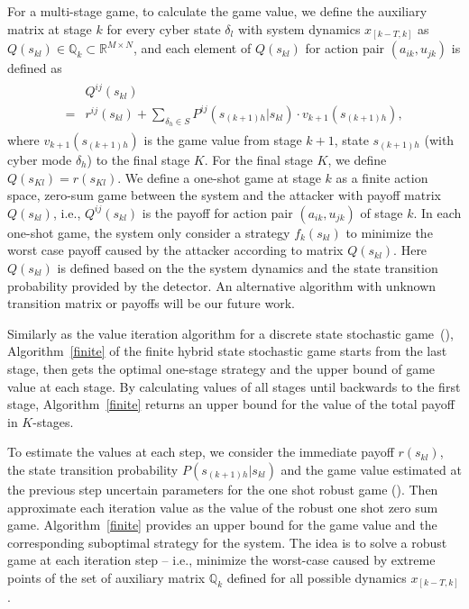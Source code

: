 For a multi-stage game, to calculate the game value, we define the auxiliary matrix at stage $k$ for every cyber state $\delta_l$ with system dynamics $x_{[k-T,k]}$ as $Q(s_{kl}) \in \mathbb{Q}_{k} \subset \mathbb{R}^{M \times N}$, and each element of $Q(s_{kl})$ for action pair $(a_{ik}, u_{jk})$ is defined as
\begin{align}
\begin{split}
&Q^{ij}(s_{kl})\\
=&r^{ij}(s_{kl})
                         +\sum_{\delta_h\in S} {P}^{ij}(s_{(k+1)h} |s_{kl})\cdot {v}_{k+1}(s_{(k+1)h}), 
\end{split}
\label{Q_k}
\end{align} 
where ${v}_{k+1}(s_{(k+1)h})$ is the game value from stage $k+1$, state $s_{(k+1)h}$ (with cyber mode $\delta_h$) to the final stage $K$. For the final stage $K$, we define $Q(s_{Kl})=r(s_{Kl})$. We define a one-shot game at stage $k$ as a finite action space, zero-sum game between the system and the attacker with payoff matrix $Q(s_{kl})$, i.e., $Q^{ij}(s_{kl})$ is the payoff for action pair $(a_{ik},u_{jk})$ of stage $k$. In each one-shot game, the system only consider a strategy $f_k(s_{kl})$ to minimize the worst case payoff caused by the attacker according to matrix $Q(s_{kl})$. Here $Q(s_{kl})$ is defined based on the the system dynamics and the state transition probability provided by the detector. An alternative algorithm with unknown transition matrix or payoffs will be our future work.

Similarly as the value iteration algorithm for a discrete state stochastic game~(\cite{plangame}), Algorithm~\ref{finite} of the finite hybrid state stochastic game starts from the last stage, then gets the optimal one-stage strategy and the upper bound of game value at each stage. By calculating values of all stages until backwards to the first stage, Algorithm~\ref{finite} returns an upper bound for the value of the total payoff in $K$-stages. 

To estimate the values at each step, we consider the immediate payoff $r(s_{kl})$, the state transition probability ${P}(s_{(k+1)h}|s_{kl})$ and the game value estimated at the previous step uncertain parameters for the one shot robust game (\cite{RGT}). Then approximate each iteration value as the value of the robust one shot zero sum game. 
Algorithm~\ref{finite} provides an upper bound for the game value and the corresponding suboptimal strategy for the system. The idea is to solve a robust game at each iteration step -- i.e., minimize the worst-case caused by extreme points of the set of auxiliary matrix $\mathbb{Q}_k$ defined for all possible dynamics $x_{[k-T,k]}$. 


